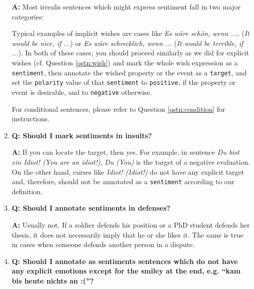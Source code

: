 \documentclass[11pt,a4paper]{article}
\theoremstyle{mytheoremstyle}
\begin{document}
\begin{enumerate}
  \textbf{A:} Most irrealis sentences which might express sentiment
  fall in two major categories:

  Typical examples of implicit wishes are cases like \textit{Es w\"are
    sch\"on, wenn ....} (\textit{It would be nice, if ...}) or
  \textit{Es w\"are schrecklich, wenn ...} (\textit{It would be
    terrible, if ...}).  In both of these cases, you should proceed
  similarly as we did for explicit wishes (cf. Question
  \ref{qstn:wish}) and mark the whole wish expression as a
  \texttt{sentiment}, then annotate the wished property or the event
  as a \texttt{target}, and set the \texttt{polarity} value of that
  \texttt{sentiment} to \texttt{positive}, if the property or event is
  desirable, and to \texttt{negative} otherwise.

  For conditional sentences, please refer to Question
  \ref{qstn:condition} for instructions.

\item\textbf{Q: Should I mark sentiments in insults?}

  \textbf{A:} If you can locate the target, then yes.  For example, in
  sentence \textit{Du bist ein Idiot! (You are an idiot!)}, \textit{Du
    (You)} is the target of a negative evaluation.  On the other hand,
  curses like \textit{Idiot!  (Idiot!)} do not have any explicit
  target and, therefore, should not be annotated as a
  \texttt{sentiment} according to our definition.

\item\textbf{Q: Should I annotate sentiments in defenses?}

  \textbf{A:} Usually not.  If a soldier defends his position or a PhD
  student defends her thesis, it does not necessarily imply that he or
  she likes it.  The same is true in cases when someone defends
  another person in a dispute.

\item\textbf{Q: Should I annotate as sentiments sentences which do not
  have any explicit emotions except for the smiley at the end,
  e.g. ``kam bis heute nichts an :(''?}


\end{enumerate}
\end{document}
